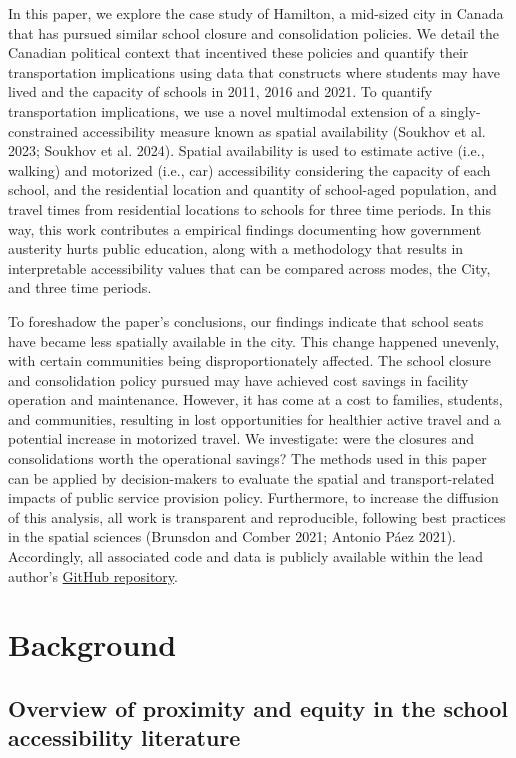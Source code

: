\documentclass[
default
]{sn-jnl}
\begin{document}
In this paper, we explore the case study of Hamilton, a mid-sized city
in Canada that has pursued similar school closure and consolidation
policies. We detail the Canadian political context that incentived these
policies and quantify their transportation implications using data that
constructs where students may have lived and the capacity of schools in
2011, 2016 and 2021. To quantify transportation implications, we use a
novel multimodal extension of a singly-constrained accessibility measure
known as spatial availability (Soukhov et al. 2023; Soukhov et al.
2024). Spatial availability is used to estimate active (i.e., walking)
and motorized (i.e., car) accessibility considering the capacity of each
school, and the residential location and quantity of school-aged
population, and travel times from residential locations to schools for
three time periods. In this way, this work contributes a empirical
findings documenting how government austerity hurts public education,
along with a methodology that results in interpretable accessibility
values that can be compared across modes, the City, and three time
periods.

To foreshadow the paper's conclusions, our findings indicate that school
seats have became less spatially available in the city. This change
happened unevenly, with certain communities being disproportionately
affected. The school closure and consolidation policy pursued may have
achieved cost savings in facility operation and maintenance. However, it
has come at a cost to families, students, and communities, resulting in
lost opportunities for healthier active travel and a potential increase
in motorized travel. We investigate: were the closures and
consolidations worth the operational savings? The methods used in this
paper can be applied by decision-makers to evaluate the spatial and
transport-related impacts of public service provision policy.
Furthermore, to increase the diffusion of this analysis, all work is
transparent and reproducible, following best practices in the spatial
sciences (Brunsdon and Comber 2021; Antonio Páez 2021). Accordingly, all
associated code and data is publicly available within the lead author's
\href{https://github.com/soukhova/School-closures-accessibility-impacts}{GitHub
repository}.

\section{Background}\label{background}

\subsection{Overview of proximity and equity in the school accessibility
literature}\label{overview-of-proximity-and-equity-in-the-school-accessibility-literature}
\end{document}
